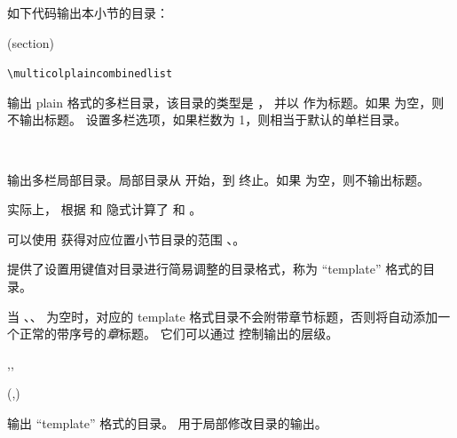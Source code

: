 \documentclass{cusdoc}
\begin{document}
如下代码输出本小节的目录：
\begin{xample}
\renewcommand\contentsname{} %
\localtableofcontents(section) %
\stopxamplecode
\xampleprint
\end{xample}

\begin{function}{\multicolplaincombinedlist}
  \begin{syntax}
    \verb|\multicolplaincombinedlist|   
  \end{syntax}
 输出 plain 格式的多栏目录，该目录的类型是 ，
并以  作为标题。如果  为空，则不输出标题。
 设置多栏选项，如果栏数为 1，则相当于默认的单栏目录。
\end{function}

\begin{function}{\multicollocalplaincombinedlist}
  \begin{syntax}
    \V\multicollocalplaincombinedlist {}
    ~~~~   
  \end{syntax}
输出多栏局部目录。局部目录从  开始，到  终止。如果  为空，则不输出标题。

实际上， 根据  和  隐式计算了  和 。

可以使用  获得对应位置小节目录的范围 、。
\end{function}

 提供了设置用键值对目录进行简易调整的目录格式，称为 ``template'' 格式的目录。

当 、、 为空时，对应的 
template 格式目录不会附带章节标题，否则将自动添加一个正常的带序号的\emph{章}标题。
它们可以通过  控制输出的层级。

\begin{function}{\templatetoc,\templatelof,\templatelot}
  \begin{syntax}
    \V\templatetoc
    \V\templatetoc {}  \string(,\string)
  \end{syntax}
输出 ``template'' 格式的目录。 用于局部修改目录的输出。
\end{function}
\end{document}
